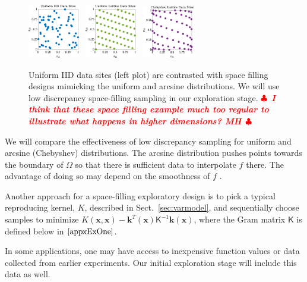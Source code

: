\documentclass[11pt]{NSFamsart}
\newcommand{\mK}{\mathsf{K}}
\newcommand{\bx}{{\boldsymbol{x}}}
\newcommand{\bk}{{\boldsymbol{k}}}
\newif\ifnotesw \noteswtrue
\newcommand{\notes}[1]{\ifnotesw \textcolor{red}{  $\clubsuit$\ {\sf \bf \it  #1}\ $\clubsuit$  }\fi}
\begin{document}
\begin{figure} %
\centering
\includegraphics[width = 0.20\textwidth]{ProgramsImages/IIDPoints.eps} \ 
\includegraphics[width = 0.20\textwidth]{ProgramsImages/ShiftedLatticePoints.eps} \ 
\includegraphics[width = 0.2\textwidth]{ProgramsImages/ChebLatticePoints.eps} 
\caption{Uniform IID data sites (left plot) are  contrasted with space filling designs mimicking the uniform  and arcsine distributions. 
We will use low discrepancy space-filling sampling in our exploration stage.
\notes{I think that these space filling example much too regular to illustrate what happens in higher dimensions?  MH} 
\label{PtsFig}}
\end{figure}

We will compare the effectiveness of low discrepancy sampling for uniform and arcsine (Chebyshev) distributions.
The arcsine distribution pushes points towards the boundary of $\Omega$ so that there is sufficient data to interpolate $f$ there.  The advantage of doing so may depend on the smoothness of $f$ \cite{HicLi12a}.

Another approach for a space-filling exploratory design is to pick a typical reproducing kernel, $K$, described in Sect.\ \ref{sec:varmodel}, and sequentially choose samples to minimize $K(\bx,\bx) - \bk^T(\bx) \mK^{-1} \bk(\bx)$, where the Gram matrix $\mK$ is defined below in $\eqref{appxExOne}$. 

In some applications, one may have access to inexpensive function values or data collected from earlier experiments.  Our initial exploration stage will include this data as well.
\end{document}
